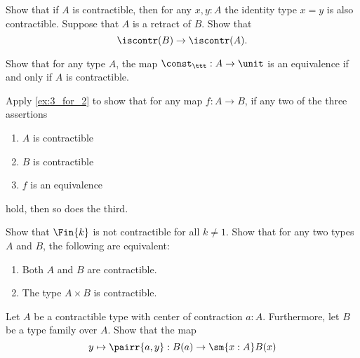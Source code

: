 \begin{exercises}
  \exitem \label{ex:prop_contr}Show that if $A$ is contractible, then for any $x,y:A$ the identity type $x=y$ is also contractible.
  \exitem \label{ex:contr_retr}Suppose that $A$ is a retract of $B$. Show that
  \begin{equation*}
    \iscontr(B)\to\iscontr(A).
  \end{equation*}
  \exitem \label{ex:contr_equiv}
  \begin{subexenum}
  \item Show that for any type $A$, the map $\const_\ttt : A\to \unit$ is an equivalence if and only if $A$ is contractible.
  \item Apply \cref{ex:3_for_2} to show that for any map $f:A\to B$, if any two of the three assertions
    \begin{enumerate}
    \item $A$ is contractible
    \item $B$ is contractible
    \item $f$ is an equivalence
    \end{enumerate}
    hold, then so does the third.
  \end{subexenum}
  \exitem \label{ex:is-not-contractible-Fin}Show that $\Fin{k}$ is not contractible for all $k\neq 1$. 
  \exitem \label{ex:is-contr-prod}Show that for any two types $A$ and $B$, the following are equivalent:
  \begin{enumerate}
  \item Both $A$ and $B$ are contractible.
  \item The type $A\times B$ is contractible.
  \end{enumerate}
  \exitem \label{ex:contr_in_sigma} Let $A$ be a contractible type with center of contraction $a:A$. Furthermore, let $B$ be a type family over $A$. Show that the map
  \begin{equation*}
    y\mapsto\pairr{a,y}:B(a)\to\sm{x:A}B(x)
  \end{equation*}

\end{exercises}
